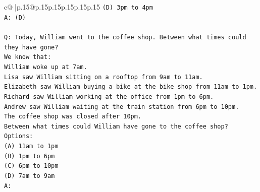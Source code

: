 \documentclass{article}
\begin{document}
{\begin{supertabular}{c@{$\;$}|p{.15\linewidth}@{}p{.15\linewidth}p{.15\linewidth}p{.15\linewidth}p{.15\linewidth}p{.15\linewidth}}
{{{\texttt{(D) 3pm to 4pm} \\
\texttt{A: (D)} \\
\\ 
\texttt{Q: Today, William went to the coffee shop. Between what times could they have gone?} \\
\texttt{We know that:} \\
\texttt{William woke up at 7am.} \\
\texttt{Lisa saw William sitting on a rooftop from 9am to 11am.} \\
\texttt{Elizabeth saw William buying a bike at the bike shop from 11am to 1pm.} \\
\texttt{Richard saw William working at the office from 1pm to 6pm.} \\
\texttt{Andrew saw William waiting at the train station from 6pm to 10pm.} \\
\texttt{The coffee shop was closed after 10pm.} \\
\texttt{Between what times could William have gone to the coffee shop?} \\
\texttt{Options:} \\
\texttt{(A) 11am to 1pm} \\
\texttt{(B) 1pm to 6pm} \\
\texttt{(C) 6pm to 10pm} \\
\texttt{(D) 7am to 9am} \\
\texttt{A:} \\
            }
        }
    }
     \\ \\


\end{supertabular}}
\end{document}
